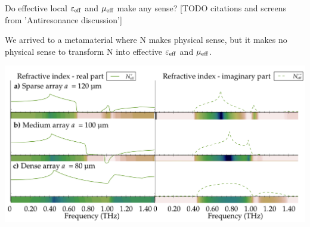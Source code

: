 \documentclass[t]{beamer} \usepackage[english]{babel} \usepackage[utf8]{inputenc} \usetheme{Frankfurt} %
\begin{document}
\begin{frame}{}	%
Do effective local $\varepsilon_{\text{eff} }$ and $\mu_{\text{eff} }$ make any sense? [TODO citations and screens from 'Antiresonance discussion']

We arrived to a metamaterial where N makes physical sense, but it makes no physical sense to transform N into effective $\varepsilon_{\text{eff} }$ and $\mu_{\text{eff} }$.
\end{frame} 		%

\begin{frame}{}	%
\includegraphics[width=1.\framewidth]{../img/ERods_sketch_of_separate_spectra_to_continuous_scan.pdf}
\end{frame} 		%
\end{document}
